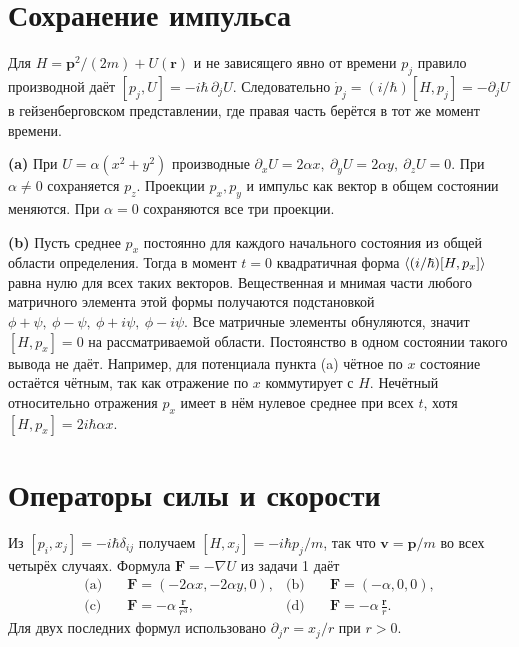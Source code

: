 \documentclass[11pt,a4paper]{article}
\begin{document}

\section{Сохранение импульса}

Для \(H=\mathbf p^2/(2m)+U(\mathbf r)\) и не зависящего явно
от времени \(p_j\) правило производной даёт
\([p_j,U]=-i\hbar\,\partial_jU\). Следовательно
\(\dot p_j=(i/\hbar)[H,p_j]=-\partial_j U\) в гейзенберговском
представлении, где правая часть берётся в тот же момент времени.

\textbf{(a)} При \(U=\alpha(x^2+y^2)\) производные
\(\partial_xU=2\alpha x,\ \partial_yU=2\alpha y,\ \partial_zU=0\).
При \(\alpha\ne0\) сохраняется \(p_z\). Проекции \(p_x,p_y\) и
импульс как вектор в общем состоянии меняются. При \(\alpha=0\)
сохраняются все три проекции.

\textbf{(b)} Пусть среднее \(p_x\) постоянно для каждого начального
состояния из общей области определения. Тогда в момент \(t=0\)
квадратичная форма \(\langle (i/\hbar)[H,p_x]\rangle\) равна нулю для
всех таких векторов. Вещественная и мнимая части любого
матричного элемента этой формы получаются подстановкой
\(\phi+\psi,\ \phi-\psi,\ \phi+i\psi,\ \phi-i\psi\).
Все матричные элементы обнуляются, значит \([H,p_x]=0\) на
рассматриваемой области. Постоянство в одном состоянии такого
вывода не даёт. Например, для потенциала пункта (a) чётное по \(x\)
состояние остаётся чётным, так как отражение по \(x\) коммутирует
с \(H\). Нечётный относительно отражения \(p_x\) имеет в нём
нулевое среднее при всех \(t\), хотя \([H,p_x]=2i\hbar\alpha x\).

\section{Операторы силы и скорости}

Из \([p_i,x_j]=-i\hbar\delta_{ij}\) получаем
\([H,x_j]=-i\hbar p_j/m\), так что
\(\mathbf v=\mathbf p/m\) во всех четырёх случаях.
Формула \(\mathbf F=-\nabla U\) из задачи 1 даёт
\begin{align*}
 \text{(a)}\quad &\mathbf F=(-2\alpha x,-2\alpha y,0),
 &\text{(b)}\quad &\mathbf F=(-\alpha,0,0),\\
 \text{(c)}\quad &\mathbf F=-\alpha\,\frac{\mathbf r}{r^3},
 &\text{(d)}\quad &\mathbf F=-\alpha\,\frac{\mathbf r}{r}.
\end{align*}
Для двух последних формул использовано
\(\partial_j r=x_j/r\) при \(r>0\).
\end{document}

